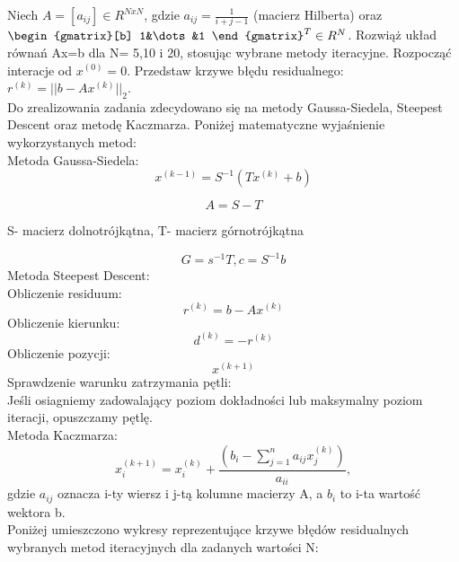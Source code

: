 \documentclass{article}
\begin{document}
Niech $A=[a_{ij}] \in R^{NxN}$, gdzie $a_{ij} = \frac{1}{i+j-1}$ (macierz Hilberta) oraz \\
$\begin{gmatrix}[b]
  1&\dots&1
\end{gmatrix}^T\in R^N$.
Rozwiąż układ równań Ax=b dla N= 5,10 i 20, stosując wybrane metody iteracyjne. Rozpocząć interacje od
$x^{(0)}=0$. Przedstaw krzywe błędu residualnego: $r^{(k)}=||b-Ax^{(k)}||_2$.\\

Do zrealizowania zadania zdecydowano się na metody Gaussa-Siedela, Steepest Descent oraz metodę Kaczmarza.
Poniżej matematyczne wyjaśnienie wykorzystanych metod:\\
Metoda Gaussa-Siedela:\\
\begin{equation}
  x^{(k-1)}=S^{-1}(Tx^{(k)}+b)
\end{equation}

\begin{equation}
  A = S-T
\end{equation}

S- macierz dolnotrójkątna,
T- macierz górnotrójkątna

\begin{equation}
  G = s^{-1}T, c=S^{-1}b
\end{equation}
Metoda Steepest Descent:\\
Obliczenie residuum:
\begin{equation}
  r^{(k)}=b-Ax^{(k)}
\end{equation}
Obliczenie kierunku: 
\begin{equation}
  d^{(k)}=-r^{(k)}
\end{equation}
Obliczenie pozycji:
\begin{equation}
  x^{(k+1)}
\end{equation}
Sprawdzenie warunku zatrzymania pętli:\\
Jeśli osiagniemy zadowalający poziom dokładności lub maksymalny poziom iteracji, opuszczamy pętlę.\\
Metoda Kaczmarza:
\begin{equation}
  x_i^{(k+1)}=x_i^{(k)}+\frac{(b_i-\sum_{j=1}^{n}a_{ij}x_j^{(k)})}{a_{ii}},
\end{equation}
gdzie $a_{ij}$ oznacza i-ty wiersz i j-tą kolumne macierzy A, a $b_i$ to i-ta wartość wektora b.\\
Poniżej umieszczono wykresy reprezentujące krzywe błędów residualnych wybranych metod iteracyjnych
dla zadanych wartości N:\\
\end{document}

